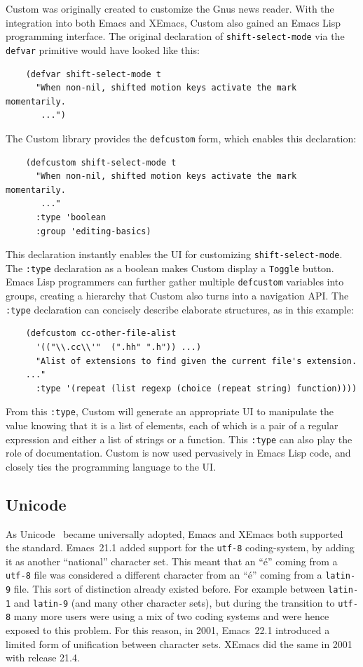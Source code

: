 \documentclass[format=acmsmall,screen]{acmart}
\newcommand \Elisp {Emacs Lisp}
\begin{document}
Custom was originally created to customize the Gnus news reader.  With
the integration into both Emacs and XEmacs, Custom also gained an
\Elisp{} programming interface.  The original declaration of
\texttt{shift-select-mode} via the \texttt{defvar} primitive would
have looked like this:
%
\begin{verbatim}
    (defvar shift-select-mode t
      "When non-nil, shifted motion keys activate the mark momentarily.
       ...")
\end{verbatim}
%
The Custom library provides the \texttt{defcustom} form, which enables
this declaration:
%
\begin{verbatim}
    (defcustom shift-select-mode t
      "When non-nil, shifted motion keys activate the mark momentarily.
       ..."
      :type 'boolean
      :group 'editing-basics)
\end{verbatim}
%
This declaration instantly enables the UI for customizing
\texttt{shift-select-mode}.  The \texttt{:type} declaration as a
boolean makes Custom display a \texttt{Toggle} button.  \Elisp{}
programmers can further gather multiple \texttt{defcustom} variables
into groups, creating a hierarchy that Custom also turns into a
navigation API.  The \texttt{:type} declaration can concisely describe
elaborate structures, as in this example:
\begin{verbatim}
    (defcustom cc-other-file-alist
      '(("\\.cc\\'"  (".hh" ".h")) ...)
      "Alist of extensions to find given the current file's extension.
    ..."
      :type '(repeat (list regexp (choice (repeat string) function))))
\end{verbatim}
From this \texttt{:type}, Custom will generate an appropriate UI to
manipulate the value knowing that it is a list of elements, each of which is
a pair of a regular expression and either a list of strings or a function.
This \texttt{:type} can also play the role of documentation.
Custom is now used pervasively in \Elisp{} code, and closely ties the
programming language to the UI.

\subsection{Unicode}
\label{sec:unicode}

As Unicode~\cite{Unicode6} became universally adopted, Emacs and XEmacs both
supported the standard.  Emacs~21.1 added support for the \texttt{utf-8}
coding-system, by adding it as another ``national'' character set.
This meant that an ``é'' coming from a \texttt{utf-8} file was considered a different
character from an ``é'' coming from a \texttt{latin-9} file.  This sort of
distinction already
existed before.  For example between \texttt{latin-1} and \texttt{latin-9} (and many other
character sets), but during the transition to \texttt{utf-8} many more users were
using a mix of two coding systems and were hence exposed to this problem.
For this reason, in 2001, Emacs~22.1 introduced a limited form of
unification between character sets.  XEmacs did the same in 2001 with
release 21.4.
\end{document}
